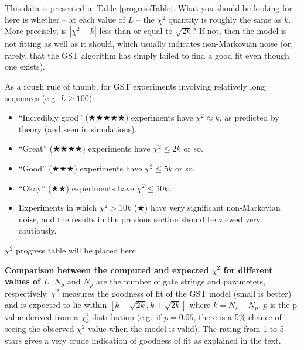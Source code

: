 \documentclass{article}[11pt]
\newcommand{\putfield}[2]{#2}
\begin{document}
This data is presented in Table \ref{progressTable}.  What you should be looking for here is whether -- at each value of $L$ -- the $\chi^2$ quantity is roughly the same as $k$.  More precisely, is $|\chi^2-k|$ less than or equal to $\sqrt{2k}$?  If not, then the model is not fitting as well as it should, which usually indicates non-Markovian noise (or, rarely, that the GST algorithm has simply failed to find a good fit even though one exists).

As a rough rule of thumb, for GST experiments involving relatively long sequences (e.g. $L\geq100$):

\begin{itemize}
\item ``Incredibly good'' ($\bigstar\bigstar\bigstar\bigstar\bigstar$) experiments have $\chi^2 \approx k$, as predicted by theory (and seen in simulations).
\item ``Great'' ($\bigstar\bigstar\bigstar\bigstar$) experiments have $\chi^2 \leq 2k$ or so.
\item ``Good'' ($\bigstar\bigstar\bigstar$) experiments have $\chi^2 \leq 5k$ or so.
\item ``Okay'' ($\bigstar\bigstar$) experiments have $\chi^2 \leq 10k$.
\item Experiments in which $\chi^2 > 10k$ ($\bigstar$) have very significant non-Markovian noise, and the results in the previous section should be viewed very cautiously.
\end{itemize}

\begin{table}[h]
\begin{center}
\putfield{progressTable}{$\chi^2$ progress table will be placed here}
\caption{\putfield{tt_progressTable}{}\textbf{Comparison between the computed and expected $\chi^2$ for different values of $L$}.  $N_S$ and $N_p$ are the number of gate strings and parameters, respectively.  $\chi^2$ measures the goodness of fit of the GST model (small is better) and is expected to lie within $[k-\sqrt{2k},k+\sqrt{2k}]$ where $k = N_s-N_p$. $p$ is the p-value derived from a $\chi^2_k$ distribution (e.g.~if $p=0.05$, there is a 5\% chance of seeing the observed $\chi^2$ value when the model is valid). The rating from 1 to 5 stars gives a very crude indication of goodness of fit as explained in the text.\label{progressTable}}
\end{center}
\end{table}
\end{document}
